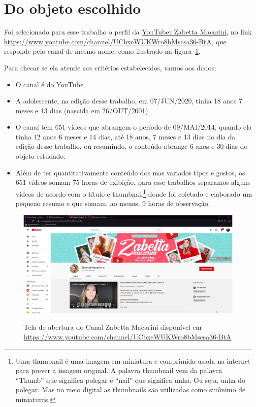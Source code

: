 \section{Do objeto escolhido}

Foi selecionado para esse trabalho o perfil da \href{https://www.youtube.com/channel/UCbxeWUKWro8bMscsa36-BtA}{YouTuber Zabetta Macarini}, no link \url{https://www.youtube.com/channel/UCbxeWUKWro8bMscsa36-BtA}, que responde pelo canal  de mesmo nome, como ilustrado na figura~\ref{fig:canal-zabetta-macarini}.

Para checar se ela atende aos critérios estabelecidos, vamos aos dados:
\begin{itemize}
    \item O canal é do YouTube
    \item A adolescente, na edição desse trabalho, em 07/JUN/2020, tinha 18 anos 7 meses e 13 dias (nascida em 26/OUT/2001)
    \item O canal tem 651 vídeos que abrangem o período de 09/MAI/2014, quando ela tinha 12 anos 6 meses e 14 dias, até 18 anos, 7 meses e 13 dias no dia da edição desse trabalho, ou resumindo, o conteúdo abrange 6 anos e 30 dias do objeto estudado.
    \item Além de ter quantitativamente conteúdo dos mas variados tipos e gostos, os 651 vídeos somam 75 horas de exibição. para esse trabalhos separamos alguns vídeos de acordo com o título e thumbnail\footnote{Uma thumbnail é uma imagem em miniatura e comprimida usada na internet para prever a imagem original. A palavra thumbnail vem da palavra “Thumb” que significa polegar e “nail” que significa unha. Ou seja, unha do polegar. Mas no meio digital as thumbnails são utilizadas como sinônimo de miniaturas.} donde foi coletado e elaborado um pequeno resumo e que somam, ao menos, 9 horas de observação.
\end{itemize}


\begin{figure}[h!]
    \centering
    \href{https://www.youtube.com/channel/UCbxeWUKWro8bMscsa36-BtA}{
        \includegraphics[width=0.999\linewidth]{fig/Canal-Zabetta-Macarini}
    }
    \caption{Tela de abertura do Canal Zabetta Macarini disponível em \url{https://www.youtube.com/channel/UCbxeWUKWro8bMscsa36-BtA}}
    \label{fig:canal-zabetta-macarini}
\end{figure}

